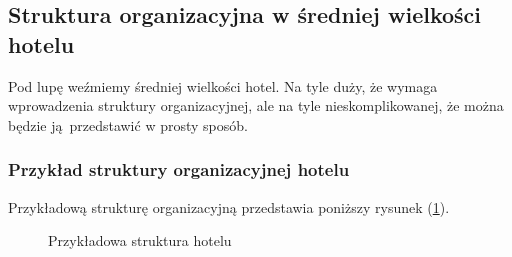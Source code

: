 \documentclass[a4paper,onecolumn,oneside,11pt,wide,floatssmall]{mwrep}
\theoremstyle{definition}
\theoremstyle{plain}%
\theoremstyle{remark}
\begin{document}
\subsection{Struktura organizacyjna w średniej wielkości hotelu}
Pod lupę weźmiemy średniej wielkości hotel. Na tyle duży, że wymaga 
wprowadzenia struktury organizacyjnej, ale na tyle nieskomplikowanej, że można 
będzie \mbox{ją przedstawić} w prosty sposób.

\subsubsection{Przykład struktury organizacyjnej hotelu}
Przykładową strukturę organizacyjną przedstawia poniższy rysunek 
(\ref{fig:struktura-hotelu}).

\begin{figure}[H]
  \begin{center}
  \end{center}
  \caption{Przykładowa struktura hotelu}
  \label{fig:struktura-hotelu}
\end{figure}
\end{document}

